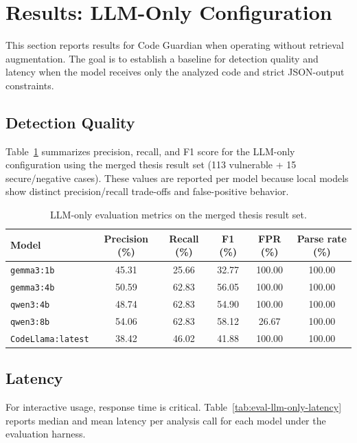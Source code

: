 \section{Results: LLM-Only Configuration}
\label{sec:eval-llm-only}

This section reports results for Code Guardian when operating without retrieval augmentation. The goal is to establish a baseline for detection quality and latency when the model receives only the analyzed code and strict JSON-output constraints.

\subsection*{Detection Quality}

Table~\ref{tab:eval-llm-only} summarizes precision, recall, and F1 score for the LLM-only configuration using the merged thesis result set (113 vulnerable + 15 secure/negative cases). These values are reported per model because local models show distinct precision/recall trade-offs and false-positive behavior.

\begin{table}[H]
  \centering
  \caption{LLM-only evaluation metrics on the merged thesis result set.}
  \label{tab:eval-llm-only}
  \small
  \begin{tabular}{lccccc}
    \toprule
    Model & Precision (\%) & Recall (\%) & F1 (\%) & FPR (\%) & Parse rate (\%) \\
    \midrule
    \texttt{gemma3:1b} & 45.31 & 25.66 & 32.77 & 100.00 & 100.00 \\
    \texttt{gemma3:4b} & 50.59 & 62.83 & 56.05 & 100.00 & 100.00 \\
    \texttt{qwen3:4b} & 48.74 & 62.83 & 54.90 & 100.00 & 100.00 \\
    \texttt{qwen3:8b} & 54.06 & 62.83 & 58.12 & 26.67 & 100.00 \\
    \texttt{CodeLlama:latest} & 38.42 & 46.02 & 41.88 & 100.00 & 100.00 \\
    \bottomrule
  \end{tabular}
\end{table}

\subsection*{Latency}

For interactive usage, response time is critical. Table~\ref{tab:eval-llm-only-latency} reports median and mean latency per analysis call for each model under the evaluation harness.

